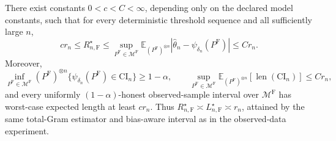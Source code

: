 There exist constants \(0<c<C<\infty\), depending only on the declared model constants, such that for every deterministic threshold sequence and all sufficiently large \(n\),
\[
 c r_n\leq R_{n,\mathrm F}^\star
 \leq\sup_{P^{\mathrm F}\in\mathcal M^{\mathrm F}}
 \mathbb E_{(P^{\mathrm F})^{\otimes n}}|\widehat\theta_n-\psi_{\delta_n}(P^{\mathrm F})|
 \leq C r_n.
\]
Moreover,
\[
 \inf_{P^{\mathrm F}\in\mathcal M^{\mathrm F}}(P^{\mathrm F})^{\otimes n}
 \{\psi_{\delta_n}(P^{\mathrm F})\in\mathrm{CI}_n\}\geq1-\alpha,
 \qquad
 \sup_{P^{\mathrm F}\in\mathcal M^{\mathrm F}}
 \mathbb E_{(P^{\mathrm F})^{\otimes n}}[\operatorname{len}(\mathrm{CI}_n)]\leq Cr_n,
\]
and every uniformly \((1-\alpha)\)-honest observed-sample interval over \(\mathcal M^{\mathrm F}\) has worst-case expected length at least \(cr_n\).  Thus \(R_{n,\mathrm F}^\star\asymp L_{n,\mathrm F}^\star\asymp r_n\), attained by the same total-Gram estimator and bias-aware interval as in the observed-data experiment.